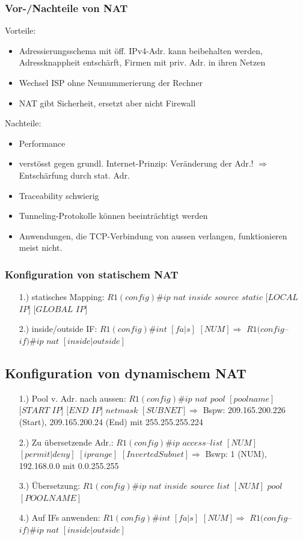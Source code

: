 \documentclass[landscape,twocolumn,a4paper]{article}
\newcommand{\Ra}{\Rightarrow}
\begin{document}
\begin{footnotesize}
\subsubsection{Vor-/Nachteile von NAT}
Vorteile:
\vspace{-3mm}
\begin{itemize}
	\item Adressierungsschema mit öff. IPv4-Adr. kann beibehalten werden, Adressknappheit entschärft, Firmen mit priv. Adr. in ihren Netzen
	\item Wechsel ISP ohne Neunummerierung der Rechner
	\item NAT gibt Sicherheit, ersetzt aber nicht Firewall
\end{itemize}
\vspace{-3mm}
Nachteile:
\vspace{-3mm}
\begin{itemize}
	\item Performance
	\item verstösst gegen grundl. Internet-Prinzip: Veränderung der Adr.! $\Ra$ Entschärfung durch stat. Adr.
	\item Traceability schwierig
	\item Tunneling-Protokolle können beeinträchtigt werden
	\item Anwendungen, die TCP-Verbindung von aussen verlangen, funktionieren meist nicht.
\end{itemize}

\subsubsection{Konfiguration von statischem NAT}
\begin{itemize}
	\item[1.)] statisches Mapping: $R1(config)\#ip$ $nat$ $inside$ $source$ $static$ $[LOCAL$ $IP]$ $[GLOBAL$ $IP]$
	\item[2.)] inside/outside IF: $R1(config)\#int$ $[fa|s]$ $[NUM]\Ra$
	$R1(config$--$if)\#ip$ $nat$ $[inside|outside]$
\end{itemize}

\subsection{Konfiguration von dynamischem NAT}
\begin{itemize}
	\item[1.)] Pool v. Adr. nach aussen: $R1(config)\#ip$ $nat$ $pool$ $[poolname]$ $[START$ $IP]$ $[END$ $IP]$ $netmask$ $[SUBNET]\Ra$ Bspw: 209.165.200.226 (Start), 209.165.200.24 (End) mit 255.255.255.224
	\item[2.)] Zu übersetzende Adr.: $R1(config)\#ip$ $access$--$list$ $[NUM]$ $[permit|deny]$ $[iprange]$ $[InvertedSubnet]\Ra$ Bswp: 1 (NUM), 192.168.0.0 mit 0.0.255.255
	\item[3.)]Übersetzung: $R1(config)\#ip$ $nat$ $inside$ $source$ $list$ $[NUM]$ $pool$ $[POOLNAME]$
	\item[4.)] Auf IFs anwenden: $R1(config)\#int$ $[fa|s]$ $[NUM]\Ra$
	$R1(config$--$if)\#ip$ $nat$ $[inside|outside]$
\end{itemize}


\end{footnotesize}
\end{document}
